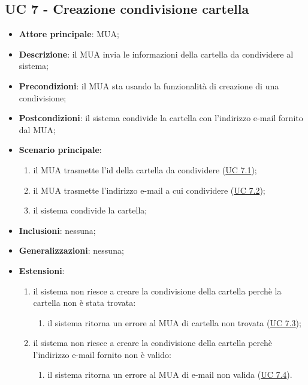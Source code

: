 \subsection{UC 7 - Creazione condivisione cartella} \label{sec:UC7}

    \begin{itemize}
        \item \textbf{Attore principale}: MUA;
        \item \textbf{Descrizione}: il MUA invia le informazioni della cartella da condividere al sistema;
        \item \textbf{Precondizioni}: il MUA sta usando la funzionalità di creazione di una condivisione;
        \item \textbf{Postcondizioni}: il sistema condivide la cartella con l'indirizzo e-mail fornito dal MUA;
        \item \textbf{Scenario principale}:
            \begin{enumerate}
                \item il MUA trasmette l'id della cartella da condividere (\hyperref[sec:UC7.1]{UC 7.1});
                \item il MUA trasmette l'indirizzo e-mail a cui condividere (\hyperref[sec:UC7.2]{UC 7.2});
                \item il sistema condivide la cartella;
            \end{enumerate}
        \item \textbf{Inclusioni}: nessuna;
        \item \textbf{Generalizzazioni}: nessuna;
        \item \textbf{Estensioni}: 
        \begin{enumerate}[label=\alph*.]
            \item il sistema non riesce a creare la condivisione della cartella perchè la cartella non è stata trovata:
            \begin{enumerate}[label=\arabic*.]
                \item il sistema ritorna un errore al MUA di cartella non trovata (\hyperref[sec:UC7.3]{UC 7.3});
            \end{enumerate}
            \item il sistema non riesce a creare la condivisione della cartella perchè l'indirizzo e-mail fornito non è valido:
            \begin{enumerate}[label=\arabic*.]
                \item il sistema ritorna un errore al MUA di e-mail non valida (\hyperref[sec:UC7.4]{UC 7.4}).
            \end{enumerate}
        \end{enumerate}
    \end{itemize}

